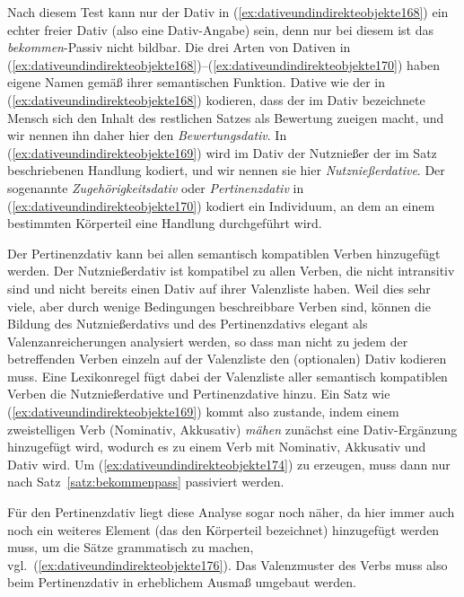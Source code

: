 
Nach diesem Test kann nur der Dativ in (\ref{ex:dativeundindirekteobjekte168}) ein echter freier Dativ (also eine Dativ-Angabe) sein, denn nur bei diesem ist das \textit{bekommen}-Passiv nicht bildbar.
Die drei Arten von Dativen in (\ref{ex:dativeundindirekteobjekte168})--(\ref{ex:dativeundindirekteobjekte170}) haben eigene Namen gemäß ihrer semantischen Funktion.
Dative wie der in (\ref{ex:dativeundindirekteobjekte168}) kodieren, dass der im Dativ bezeichnete Mensch sich den Inhalt des restlichen Satzes als Bewertung zueigen macht, und wir nennen ihn daher hier den \textit{Bewertungsdativ}.
In (\ref{ex:dativeundindirekteobjekte169}) wird im Dativ der Nutznießer der im Satz beschriebenen Handlung kodiert, und wir nennen sie hier \textit{Nutznießerdative}.
Der sogenannte \textit{Zugehörigkeitsdativ} oder \textit{Pertinenzdativ} in (\ref{ex:dativeundindirekteobjekte170}) kodiert ein Individuum, an dem an einem bestimmten Körperteil eine Handlung durchgeführt wird.


Der Pertinenzdativ kann bei allen semantisch kompatiblen Verben hinzugefügt werden.
Der Nutznießerdativ ist kompatibel zu allen Verben, die nicht intransitiv sind und nicht bereits einen Dativ auf ihrer Valenzliste haben.
Weil dies sehr viele, aber durch wenige Bedingungen beschreibbare Verben sind, können die Bildung des Nutznießerdativs und des Pertinenzdativs elegant als Valenzanreicherungen analysiert werden, so dass man nicht zu jedem der betreffenden Verben einzeln auf der Valenzliste den (optionalen) Dativ kodieren muss.
Eine Lexikonregel fügt dabei der Valenzliste aller semantisch kompatiblen Verben die Nutznießerdative und Pertinenzdative hinzu.
Ein Satz wie (\ref{ex:dativeundindirekteobjekte169}) kommt also zustande, indem einem zweistelligen Verb (Nominativ, Akkusativ) \textit{mähen} zunächst eine Dativ-Ergänzung hinzugefügt wird, wodurch es zu einem Verb mit Nominativ,  Akkusativ und Dativ wird.
Um (\ref{ex:dativeundindirekteobjekte174}) zu erzeugen, muss dann nur nach Satz~\ref{satz:bekommenpass} passiviert werden.

Für den Pertinenzdativ liegt diese Analyse sogar noch näher, da hier immer auch noch ein weiteres Element (das den Körperteil bezeichnet) hinzugefügt werden muss, um die Sätze grammatisch zu machen, vgl.\ (\ref{ex:dativeundindirekteobjekte176}).
Das Valenzmuster des Verbs muss also beim Pertinenzdativ in erheblichem Ausmaß umgebaut werden.


